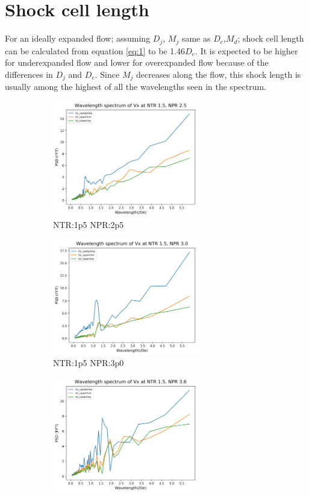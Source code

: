 \section{Shock cell length}
For an ideally expanded flow; assuming $D_j$, $M_j$ same as $D_e$,$M_d$; shock cell length can be calculated from equation \ref{eq:1}  to be 1.46$D_e$. It is expected to be higher for underexpanded flow and lower for overexpanded flow because of the differences in $D_j$ and $D_e$. Since $M_j$ decreases along the flow, this shock length is usually among the highest of all the wavelengths seen in the spectrum.\\ 

\begin{figure}[H]
\begin{subfigure}{.5\textwidth}
	\centering
	\includegraphics[width=2.5in]{images/Fft_Vx_NTR1p5_NPR2p5.png}
	\caption{NTR:1p5 NPR:2p5 }
	\label{fig:fftplots1p52p5}
\end{subfigure}%
\begin{subfigure}{.5\textwidth}
	\centering
	\includegraphics[width=2.5in]{images/Fft_Vx_NTR1p5_NPR3p0.png}
	\caption{NTR:1p5 NPR:3p0 }
	\label{fig:fftplots1p53p0}
\end{subfigure}
\begin{subfigure}{0.5\textwidth}
	\centering
	\includegraphics[width=2.5in]{images/Fft_Vx_NTR1p5_NPR3p6.png}

\end{subfigure}
\end{figure}
